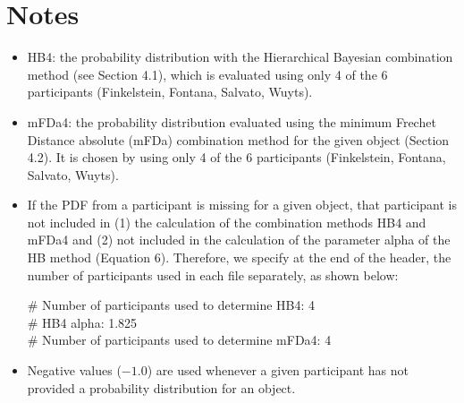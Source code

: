 \section*{Notes}
\begin{itemize}

\item HB4: the probability distribution with the Hierarchical Bayesian combination method (see Section 4.1), which is evaluated using only 4 of the 6 participants (Finkelstein, Fontana, Salvato, Wuyts).

\item mFDa4: the probability distribution evaluated using the minimum Frechet Distance absolute (mFDa) combination method for the given object (Section 4.2).  It is chosen by using only 4 of the 6 participants (Finkelstein, Fontana, Salvato, Wuyts).

\item If the PDF from a participant is missing for a given object, that participant is not included in (1) the calculation of the combination methods HB4 and mFDa4 and (2) not included in the calculation of the parameter alpha of the HB method (Equation 6). Therefore, we specify at the end of the header, the number of participants used in each file separately, as shown below:

\# Number of participants used to determine HB4: 4\\
\# HB4 alpha: 1.825\\
\# Number of participants used to determine mFDa4: 4

\item Negative values ($-1.0$) are used whenever a given participant has not provided a probability distribution for an object.

\end{itemize}
